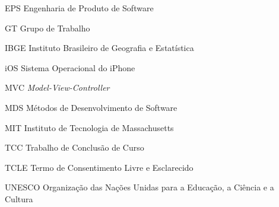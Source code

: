 \begin{siglas}
  \item[EPS] Engenharia de Produto de Software
  \item[GT] Grupo de Trabalho
  \item[IBGE] Instituto Brasileiro de Geografia e Estatística
  \item[iOS] Sistema Operacional do iPhone 
  \item[MVC] \textit{Model-View-Controller}
  \item[MDS] Métodos de Desenvolvimento de Software
  \item[MIT] Instituto de Tecnologia de Massachusetts
  \item[TCC] Trabalho de Conclusão de Curso 
  \item[TCLE] Termo de Consentimento Livre e Esclarecido 
  \item[UNESCO] Organização das Nações Unidas para a Educação, a Ciência e a Cultura
\end{siglas}

